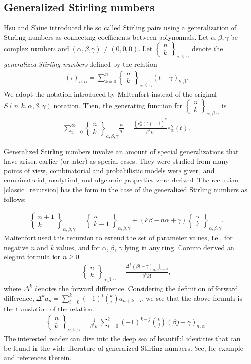 \documentclass[12pt, reqno]{amsart}
\newtheorem{proof 1}{proof 1}
\def\sts#1#2{\begin{Bmatrix}
#1 \\ #2 \end{Bmatrix}}
\begin{document}
\subsection{Generalized Stirling numbers}
Hsu and Shiue \cite{hsu1998unified} introduced the so called Stirling pairs using a generalization of Stirling numbers as connecting coefficients between polynomials.  Let $\alpha,\beta,\gamma$ be complex numbers and $(\alpha,\beta,\gamma)\not = (0,0,0)$. Let $\sts{n}{k}_{\alpha, \beta, \gamma} $ denote the \emph{generalized Stirling numbers} defined by the relation
\begin{align*}
(t)_{n,\alpha} = \sum_{k=0}^{n}\sts{n}{k}_{\alpha, \beta, \gamma} (t-\gamma)_{k,\beta}.
\end{align*}
We adopt the notation introduced by Maltenfort \cite{Maltenfort2020} instead of the original $S(n,k,\alpha,\beta,\gamma)$ notation.
Then, the generating function for $\sts{n}{k}_{\alpha, \beta, \gamma}$ is  \cite{hsu1998unified}
 \begin{align*}
 \sum_{n=0}^{\infty} \sts{n}{k}_{\alpha, \beta, \gamma}\frac{t^n}{n!} = \frac{(e^{\beta}_{\alpha}(t)-1)^k}{\beta^kk!}e^{\gamma}_{\alpha}(t). 
 \end{align*}

Generalized Stirling numbers involve an amount of special generalizations that have arisen earlier (or later) as special cases. They were studied from many points of view,  combinatorial and probabilistic models were given, and combinatorial, analytical, and algebraic properties were derived.
The recursion \eqref{classic_recursion} has the form in the case of the generalized Stirling numbers as follows:

\begin{align*}
\sts{n+1}{k}_{\alpha, \beta, \gamma} = \sts{n}{k-1}_{\alpha, \beta, \gamma} + (k\beta -n\alpha + \gamma) \sts{n}{k}_{\alpha, \beta, \gamma}.
\end{align*}
Maltenfort \cite{Maltenfort2020} used this recursion to extend the set of parameter values, i.e., for negative $n$ and $k$ values, and for $\alpha$, $\beta$, $\gamma$ lying in any ring.  
Corcino \cite{corcino2001some} derived an elegant formula    for $n\geq 0$
\begin{align*}
\sts{n}{k}_{\alpha,\beta,\gamma} = \frac{\Delta^k(\beta t+ \gamma)_{\alpha,n}|_{t=0}}{\beta^kk!},
\end{align*}
where $\Delta^k$ denotes the forward difference. Considering the definition of forward difference, $\Delta^ka_n = \sum_{i=0}^{k} (-1)^{i}\binom{k}{i}a_{n+k-i}$, we see that the above formula is the translation of the relation:
\begin{align*}
 \sts{n}{k}_{\alpha,\beta,\gamma} =\frac{1}{\beta^kk!}\sum_{j=0}^{k}(-1)^{k-j}\binom{k}{j}(\beta j+\gamma)_{n,\alpha}.
 \end{align*}
The interested reader can dive into the deep sea of beautiful identities that can be found in the wide literature of generalized Stirling numbers. See, for example \cite{benyi2022unfair,corcino2001combinatorial,corcino2001some,kargin2018higher,Maltenfort2020,schork2024stirling} and references therein.
\end{document}
